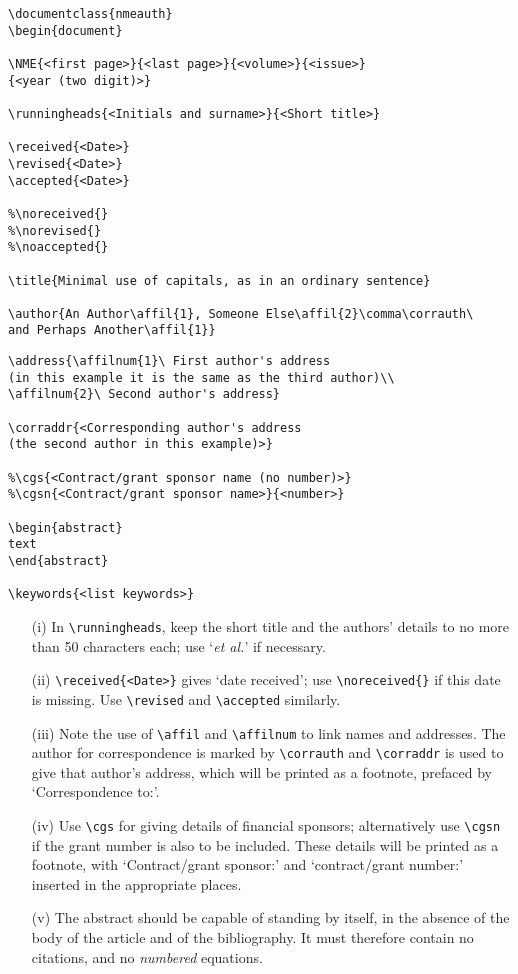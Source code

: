\documentclass{nmeauth}
\begin{document}
\begin{verbatim}
\documentclass{nmeauth}
\begin{document}

\NME{<first page>}{<last page>}{<volume>}{<issue>}
{<year (two digit)>}

\runningheads{<Initials and surname>}{<Short title>}

\received{<Date>}
\revised{<Date>}
\accepted{<Date>}

%\noreceived{}
%\norevised{}
%\noaccepted{}

\title{Minimal use of capitals, as in an ordinary sentence}

\author{An Author\affil{1}, Someone Else\affil{2}\comma\corrauth\
and Perhaps Another\affil{1}}
\end{verbatim} %
\begin{verbatim}
\address{\affilnum{1}\ First author's address
(in this example it is the same as the third author)\\
\affilnum{2}\ Second author's address}

\corraddr{<Corresponding author's address
(the second author in this example)>}

%\cgs{<Contract/grant sponsor name (no number)>}
%\cgsn{<Contract/grant sponsor name>}{<number>}

\begin{abstract}
text
\end{abstract}

\keywords{<list keywords>}
\end{verbatim}

\begin{enumerate}
\item[(i)]
In \verb"\runningheads", keep the short title and the authors' details
to no more than 50 characters each; use `\emph{et al.}' if necessary.
\item[(ii)]
\verb"\received{<Date>}" gives `date received';
use \verb"\noreceived{}" if this date is missing.
Use \verb"\revised" and \verb"\accepted" similarly.
\item[(iii)]
Note the use of \verb"\affil" and \verb"\affilnum"
to link names and addresses.
The author for correspondence is marked by \verb"\corrauth"
and \verb"\corraddr" is used to give that author's address,
which will be printed as a footnote, prefaced by `Correspondence to:'.
\item[(iv)]
Use \verb"\cgs" for giving details of financial sponsors; alternatively
use \verb"\cgsn" if the grant number is also to be included.
These details will be printed as a footnote,
with `Contract/grant sponsor:' and `contract/grant number:'
inserted in the appropriate places.
\item[(v)]
The abstract should be capable of standing by itself, in the absence
of the body of the article and of the bibliography.  It must therefore
contain no citations, and no \emph{numbered} equations.

\end{enumerate}
\end{document}
